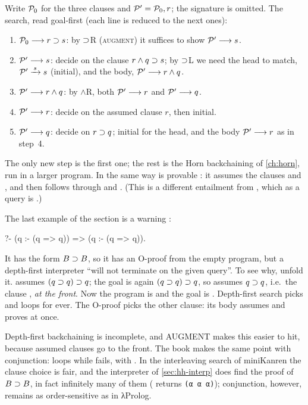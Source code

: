 {\begin{tutorial}[the O-proof of \texttt{r => s}]
Write $\mathcal{P}_0$ for the three clauses and $\mathcal{P}'=\mathcal{P}_0,r$; the signature is omitted. The search, read
goal-first (each line is reduced to the next ones):
\begin{enumerate}
  \item $\mathcal{P}_0\longrightarrow r\supset s$: by $\supset$R (\textsc{augment}) it suffices to show
        $\mathcal{P}'\longrightarrow s$.
  \item $\mathcal{P}'\longrightarrow s$: decide on the clause $r\wedge q\supset s$; by $\supset$L we need the head to
        match, $\mathcal{P}'\xrightarrow{\,s\,}s$ (initial), and the body, $\mathcal{P}'\longrightarrow r\wedge q$.
  \item $\mathcal{P}'\longrightarrow r\wedge q$: by $\wedge$R, both $\mathcal{P}'\longrightarrow r$ and
        $\mathcal{P}'\longrightarrow q$.
  \item $\mathcal{P}'\longrightarrow r$: decide on the assumed clause $r$, then initial.
  \item $\mathcal{P}'\longrightarrow q$: decide on $r\supset q$; initial for the head, and the body
        $\mathcal{P}'\longrightarrow r$ as in step~4.
\end{enumerate}
The only new step is the first one; the
rest is the Horn backchaining of \cref{ch:horn}, run in a larger program. In the same way
 is provable : it assumes the clauses  and , and then
 follows through  and . (This is a different entailment from , which as a
query is .)
\end{tutorial}

The last example of the section is a warning :
\begin{lprolog}
?- (q :- (q => q)) => (q :- (q => q)).
\end{lprolog}
It has the form $B\supset B$, so it has an O-proof from the empty program, but a depth-first interpreter
``will not terminate on the given query''. To see why, unfold it.  assumes
$(q\supset q)\supset q$; the goal is again $(q\supset q)\supset q$, so  assumes $q\supset q$, i.e.\ the
clause , \emph{at the front}. Now the program is \lp{[q :- q, q :- (q => q)]} and the goal
is . Depth-first search picks  and loops for ever. The O-proof picks the other clause:
its body  assumes  and proves  at once.

\begin{pitfall}
Depth-first backchaining is incomplete, and AUGMENT makes this easier to hit, because assumed clauses
go to the front. The book makes the same point with conjunction:  loops while
 fails, with  . In the interleaving search of miniKanren the
clause choice is fair, and the interpreter of \cref{sec:hh-interp} does find the proof of $B\supset B$, in fact
infinitely many of them ( returns \texttt{(α α α)}); conjunction, however, remains as
order-sensitive as in λProlog.
\end{pitfall}

}
